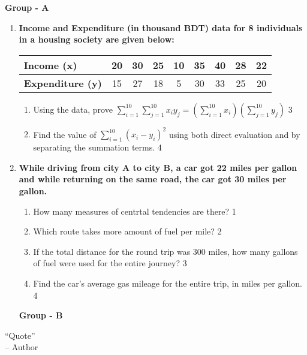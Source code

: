 \documentclass[12pt]{article}
\begin{document}
\begin{center}
\textbf{Group  - A}
\end{center}

  \begin{enumerate}
  
    \item
\textbf{Income and Expenditure (in thousand BDT) data for 8 individuals in a housing society are given below:}

\begin{table}[h]
\centering
\begin{tabular}{l|cccccccc}
\textbf{Income (x)}       & 20 & 30 & 25 & 10 & 35 & 40 & 28 & 22 \\ \hline
\textbf{Expenditure (y)}  & 15 & 27 & 18 &  5 & 30 & 33 & 25 & 20
\end{tabular}
\end{table}


  \begin{enumerate}
    \item Using the data, prove $\displaystyle \sum_{i=1}^{10} \sum_{j=1}^{10}x_i y_j = (\sum_{i=1}^{10}x_i) (\sum_{j=1}^{10} y_j)$ \hfill 3
     \item Find the value of $\sum_{i=1}^{10} (x_i- y_i)^2$ using both direct evaluation and by separating the summation terms. \hfill 4
  \end{enumerate}

  
  \item
	  \textbf{While driving from city A to city B, a car got 22 miles per gallon and
while returning on the same road, the car got 30 miles per gallon.} 
  
  \begin{enumerate}
    \item
	How many measures of centrtal tendencies are there? \hfill 1
    \item
	Which route takes more amount of fuel per mile? \hfill 2
    \item  
	If the total distance for the round trip was 300 miles, how many gallons of fuel were used for the entire journey?  \hfill 3
    \item
	Find the car’s average gas mileage for the entire trip, in miles per gallon. \hfill 4
  \end{enumerate}


\begin{center}
\textbf{Group  - B}
\end{center}
  
\end{enumerate}

 \vspace{2.5cm}

\begin{center}
 “Quote” \\ -- Author
\end{center}
\end{document}

